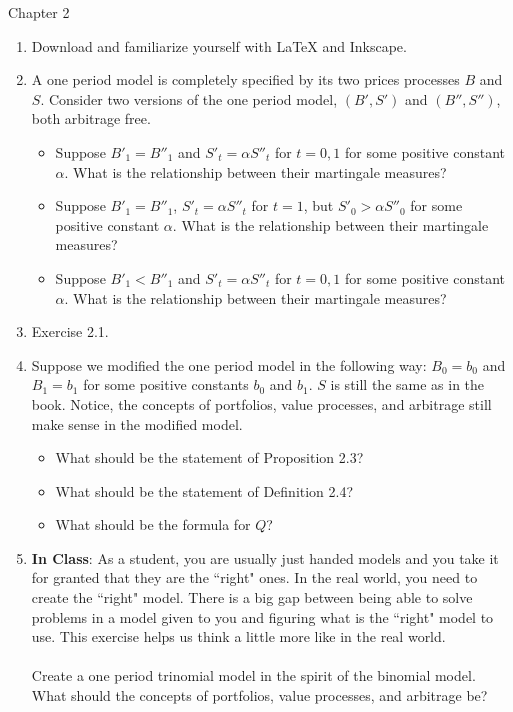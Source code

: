 \documentclass[12pt]{article}
\renewcommand{\a}{\alpha}
\begin{document}
Chapter 2

\begin{enumerate}
  \item Download and familiarize yourself with LaTeX and Inkscape.
  \item A one period model is completely specified by its two prices processes $B$ and $S$. Consider two versions of the one period model, $(B', S')$ and $(B'', S'')$, both arbitrage free.
  \begin{itemize}
    \item Suppose $B'_1 = B''_1$ and $S'_t = \a S''_t$ for $t = 0, 1$ for some positive constant $\a$. What is the relationship between their martingale measures?
    \item Suppose $B'_1 = B''_1$, $S'_t = \a S''_t$ for $t = 1$, but $S'_0 > \a S''_0$ for some positive constant $\a$. What is the relationship between their martingale measures?
    \item Suppose $B'_1 < B''_1$ and $S'_t = \a S''_t$ for $t = 0, 1$ for some positive constant $\a$. What is the relationship between their martingale measures?
  \end{itemize}
  \item Exercise 2.1.
  \item Suppose we modified the one period model in the following way: $B_0 = b_0$ and $B_1 = b_1$ for some positive constants $b_0$ and $b_1$. $S$ is still the same as in the book. Notice, the concepts of portfolios, value processes, and arbitrage still make sense in the modified model.
  \begin{itemize}
    \item What should be the statement of Proposition 2.3?
    \item What should be the statement of Definition 2.4?
    \item What should be the formula for $Q$?
  \end{itemize}
  \item[] \textbf{In Class}: As a student, you are usually just handed models and you take it for granted that they are the ``right" ones. In the real world, you need to create the ``right" model. There is a big gap between being able to solve problems in a model given to you and figuring what is the ``right" model to use. This exercise helps us think a little more like in the real world.
  \\
  \\
  Create a one period trinomial model in the spirit of the binomial model. What should the concepts of portfolios, value processes, and arbitrage be?

\end{enumerate}
\end{document}
